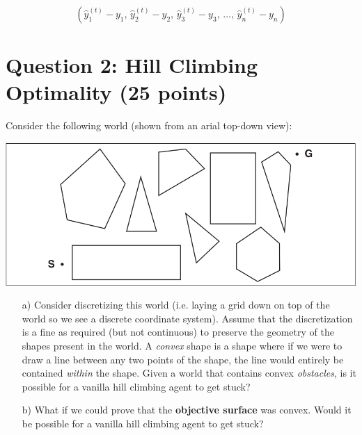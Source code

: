 \documentclass[11pt]{article}
\newcommand{\question}[1]{\section*{\normalsize #1}}
\begin{document}
\[\left( \hat{y}_1^{(t)} - y_1,\, \hat{y}_2^{(t)} - y_2,\, \hat{y}_3^{(t)} - y_3,\, \dots ,\, \hat{y}_n^{(t)} - y_n\right)\]

\newpage

\question{Question 2: Hill Climbing Optimality (25 points)}
Consider the following world (shown from an arial top-down view):

\includegraphics[width=0.8\linewidth]{./imgs/polygon_hill_climbing_map.png}

\begin{enumerate}
    \item[a)] Consider discretizing this world (i.e. laying a grid down on top of the world so we see a discrete coordinate system). Assume that the discretization is a fine as required (but not continuous) to preserve the geometry of the shapes present in the world. A \textit{convex} shape is a shape where if we were to draw a line between any two points of the shape, the line would entirely be contained \textit{within} the shape. Given a world that contains convex \textit{obstacles}, is it possible for a vanilla hill climbing agent to get stuck?

    \item[b)] What if we could prove that the \textbf{objective surface} was convex. Would it be possible for a vanilla hill climbing agent to get stuck?
\end{enumerate}

\bigskip
\end{document}
